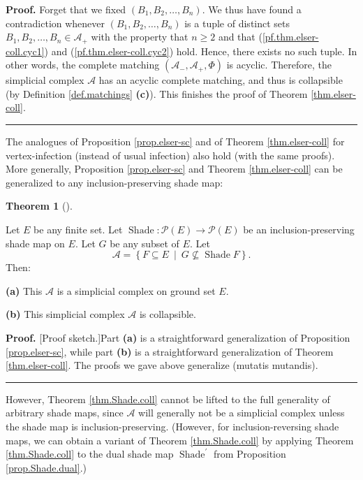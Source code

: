 \documentclass[numbers=enddot,12pt,final,onecolumn]{scrartcl}%
\theoremstyle{definition}
\newtheorem{theo}{Theorem}[section]
\newenvironment{theorem}[1][]
{\begin{theo}[#1]\begin{leftbar}}
{\end{leftbar}\end{theo}}
\newenvironment{proof}[1][Proof]{\noindent\textbf{#1.} }{\ \rule{0.5em}{0.5em}}
\renewcommand{\geq}{\geqslant}
\begin{document}
\begin{proof}
Forget that we fixed $\left(  B_{1},B_{2},\ldots,B_{n}\right)  $. We thus have
found a contradiction whenever $\left(  B_{1},B_{2},\ldots,B_{n}\right)  $ is
a tuple of distinct sets $B_{1},B_{2},\ldots,B_{n}\in\mathcal{A}_{+}$ with the
property that $n\geq2$ and that (\ref{pf.thm.elser-coll.cyc1}) and
(\ref{pf.thm.elser-coll.cyc2}) hold. Hence, there exists no such tuple. In other
words, the complete matching $\left(  \mathcal{A}_{-},\mathcal{A}_{+}%
,\Phi\right)  $ is acyclic. Therefore, the simplicial complex $\mathcal{A}$
has an acyclic complete matching, and thus is collapsible (by Definition
\ref{def.matchings} \textbf{(c)}). This finishes the proof of Theorem
\ref{thm.elser-coll}.
\end{proof}

The analogues of Proposition \ref{prop.elser-sc} and of Theorem
\ref{thm.elser-coll} for vertex-infection (instead of usual infection) also
hold (with the same proofs). More generally, Proposition \ref{prop.elser-sc}
and Theorem \ref{thm.elser-coll} can be generalized to any
inclusion-preserving shade map:

\begin{theorem}
\label{thm.Shade.coll}Let $E$ be any finite set. Let $\operatorname*{Shade}%
:\mathcal{P}\left(  E\right)  \rightarrow\mathcal{P}\left(  E\right)  $ be an
inclusion-preserving shade map on $E$. Let $G$ be any subset of $E$. Let%
\[
\mathcal{A}=\left\{  F\subseteq E\ \mid\ G\not \subseteq \operatorname*{Shade}%
F\right\}  .
\]
Then:

\textbf{(a)} This $\mathcal{A}$ is a simplicial complex on ground set $E$.

\textbf{(b)} This simplicial complex $\mathcal{A}$ is collapsible.
\end{theorem}

\begin{proof}
[Proof sketch.]Part \textbf{(a)} is a straightforward generalization of
Proposition \ref{prop.elser-sc}, while part \textbf{(b)} is a straightforward
generalization of Theorem \ref{thm.elser-coll}. The proofs we gave above
generalize (mutatis mutandis).
\end{proof}

However, Theorem \ref{thm.Shade.coll} cannot be lifted to the full generality
of arbitrary shade maps, since $\mathcal{A}$ will generally not be a
simplicial complex unless the shade map is inclusion-preserving. (However, for
inclusion-reversing shade maps, we can obtain a variant of Theorem
\ref{thm.Shade.coll} by applying Theorem \ref{thm.Shade.coll} to the dual
shade map $\operatorname*{Shade}\nolimits^{\prime}$ from Proposition
\ref{prop.Shade.dual}.)
\end{document}
